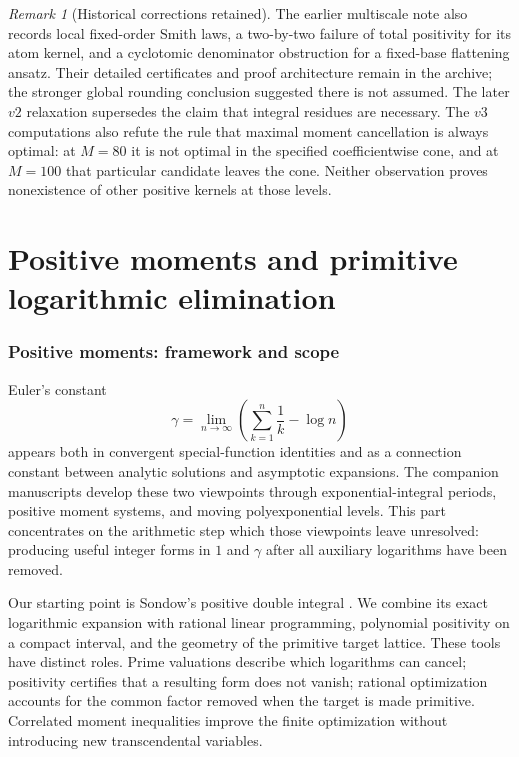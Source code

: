 \documentclass[11pt,a4paper]{article}
\theoremstyle{definition}
\theoremstyle{remark}
\newtheorem{remark}[theorem]{Remark}
\numberwithin{equation}{section}
\begin{document}
\begin{remark}[Historical corrections retained]\label{fd:rem:history}
The earlier multiscale note also records local fixed-order Smith laws,
a two-by-two failure of total positivity for its atom kernel, and a
cyclotomic denominator obstruction for a fixed-base flattening ansatz.
Their detailed certificates and proof architecture remain in the archive;
the stronger global rounding conclusion suggested there is not assumed.
The later $v2$ relaxation supersedes the claim that integral residues are
necessary.  The $v3$ computations also refute the rule that maximal
moment cancellation is always optimal: at $M=80$ it is not optimal in
the specified coefficientwise cone, and at $M=100$ that particular
candidate leaves the cone.  Neither observation proves nonexistence of
other positive kernels at those levels.
\end{remark}


\clearpage
\part{Positive moments and primitive logarithmic elimination}\label{master:moments}
\section{Positive moments: framework and scope}\label{pm:sec:introduction}

Euler's constant
\[
 \gamma=\lim_{n\to\infty}\left(\sum_{k=1}^n\frac1k-\log n\right)
\]
appears both in convergent special-function identities and as a connection
constant between analytic solutions and asymptotic expansions.  The companion
manuscripts \cite{pm:KEIO001,pm:KEIO002} develop these two viewpoints through
exponential-integral periods, positive moment systems, and moving
polyexponential levels.  This part concentrates on the arithmetic
step which those viewpoints leave unresolved: producing useful integer
forms in $1$ and $\gamma$ after all auxiliary logarithms have been removed.

Our starting point is Sondow's positive double integral
\cite{pm:Sondow2003}.  We combine its exact logarithmic expansion with rational
linear programming, polynomial positivity on a compact interval, and the
geometry of the primitive target lattice.  These tools have distinct roles.
Prime valuations describe which logarithms can cancel; positivity certifies
that a resulting form does not vanish; rational optimization accounts for
the common factor removed when the target is made primitive.  Correlated
moment inequalities improve the finite optimization without introducing
new transcendental variables.
\end{document}
